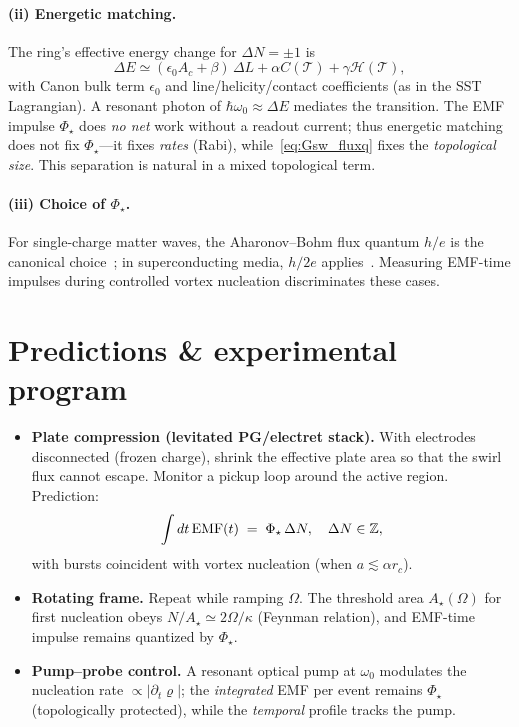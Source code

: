 \documentclass[11pt,a4paper]{article}
\begin{document}
\paragraph{(ii) Energetic matching.}
    The ring’s effective energy change for $\Delta N=\pm1$ is
    \begin{equation}
    \Delta E \simeq (\epsilon_0 A_c + \beta)\,\Delta L + \alpha C(\mathcal T)+\gamma \mathcal H(\mathcal T),
    \end{equation}
    with Canon bulk term $\epsilon_0$ and line/helicity/contact coefficients (as in the SST Lagrangian). A resonant photon of $\hbar\omega_0\!\approx\!\Delta E$ mediates the transition. The EMF impulse $\Phi_\star$ does \emph{no net} work without a readout current; thus energetic matching does not fix $\Phi_\star$—it fixes \emph{rates} (Rabi), while~\eqref{eq:Gsw_fluxq} fixes the \emph{topological size}. This separation is natural in a mixed topological term.

\paragraph{(iii) Choice of $\Phi_\star$.}
    For single-charge matter waves, the Aharonov--Bohm flux quantum $h/e$ is the canonical choice~\cite{Aharonov1959}; in superconducting media, $h/2e$ applies~\cite{Tinkham2004}. Measuring EMF-time impulses during controlled vortex nucleation discriminates these cases.

\section{Predictions \& experimental program}
\begin{itemize}
\item \textbf{Plate compression (levitated PG/electret stack).} With electrodes disconnected (frozen charge), shrink the effective plate area so that the swirl flux cannot escape. Monitor a pickup loop around the active region. Prediction:
\[
    \int dt\,{\rm EMF}(t) \;=\; \Phi_\star\,\Delta N, \quad \Delta N\in\mathbb Z,
\]
with bursts coincident with vortex nucleation (when $a\lesssim\alpha r_c$).
\item \textbf{Rotating frame.} Repeat while ramping $\Omega$. The threshold area $A_\star(\Omega)$ for first nucleation obeys $N/A_\star\simeq 2\Omega/\kappa$ (Feynman relation), and EMF-time impulse remains quantized by $\Phi_\star$.
\item \textbf{Pump--probe control.} A resonant optical pump at $\omega_0$ modulates the nucleation rate $\propto |\partial_t \bm{\varrho}|$; the \emph{integrated} EMF per event remains $\Phi_\star$ (topologically protected), while the \emph{temporal} profile tracks the pump.
\end{itemize}
\end{document}
